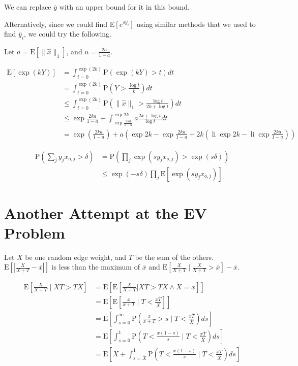 \documentclass{article}
\newcommand \E[1] {\mathrm E \left[#1\right]} %
\newcommand \p[1] {\mathrm P \left(#1\right)}
\DeclareMathOperator{\li}{li}
\begin{document}
We can replace $\overline y$ with an upper bound for it in this bound.

Alternatively, since we could find $\E{e^{sy_i}}$ using similar methods that we used to find $\overline y_i$, we could try the following.

Let $a=\E{\|\hat x\|_1}$, and $u=\frac{2a}{1-a}$.

\begin{align*}
\E{\exp(kY)} &= \int_{t=0}^{\exp(2k)} \p{\exp(kY)>t} dt \\
&= \int_{t=0}^{\exp(2k)} \p{Y>\frac{\log t}k} dt \\
&\leq \int_{t=0}^{\exp(2k)} \p{\|\hat x\|_1 > \frac{\log t}{2k+\log t}} dt \\
&\leq \exp{\frac{2ka}{1-a}} + \int_{\exp\frac{2ka}{1-a}}^{\exp{2k}} a\frac{2k+\log t}{\log t} dt \\
&= \exp \left(\frac{2ka}{1-a}\right) + a\left(\exp{2k}-\exp{\frac{2ka}{1-a}} + 2k\left(\li{\exp{2k}}-\li{\exp{\frac{2ka}{1-a}}}\right)\right)
\end{align*}

\begin{align*}
\p{\sum_j y_jx_{o,j} >\delta} &= \p{\prod_j \exp(sy_jx_{o,j}) > \exp(s\delta)} \\
&\leq \exp(-s\delta)\prod_j \E{\exp(sy_jx_{o,j})}
\end{align*}

\section{Another Attempt at the EV Problem}

Let $X$ be one random edge weight, and $T$ be the sum of the others. $\E{\left|\frac{X}{X+T}-\overline x\right|}$ is less than the maximum of $\overline x$ and $\E{\frac{X}{X+T} \mid \frac{X}{X+T}>\overline x}-\overline x$.

\begin{align*}
\E{\frac{X}{X+T} \mid X\overline T > T\overline X} &= \E{\E{\frac{X}{X+T} | X\overline T>T\overline X \wedge X=x}} \\
&= \E{\E{\frac{x}{x+T} \mid T<\frac{x\overline T}{\overline X}}} \\
&= \E{\int_{s=0}^\infty \p{\frac{x}{x+T}>s \mid T<\frac{x\overline T}{\overline X}} ds} \\
&= \E{\int_{s=0}^1 \p{T<\frac{x(1-s)}s \mid T<\frac{x\overline T}{\overline X}} ds} \\
&= \E{\overline X + \int_{s=\overline X}^1 \p{T<\frac{x(1-s)}s \mid T<\frac{x\overline T}{\overline X}} ds} \\
\end{align*}
\end{document}
